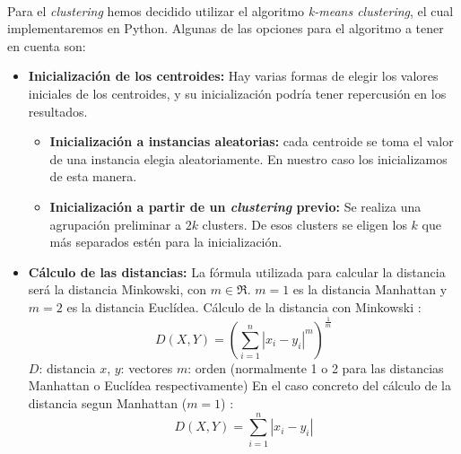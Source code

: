 \documentclass[10pt,a4paper]{article}
\begin{document}
	\paragraph{}
	Para el \textit{clustering} hemos decidido utilizar el algoritmo \textit{k-means clustering}, el cual implementaremos en Python. Algunas de las opciones para el algoritmo a tener en cuenta son:
	\begin{itemize}
		\item \textbf{Inicialización de los centroides:} Hay varias formas de elegir los valores iniciales de los centroides, y su inicialización podría tener repercusión en los resultados.
		\begin{itemize}
		    \item \textbf{Inicialización a instancias aleatorias: } cada centroide se toma el valor de una instancia elegia aleatoriamente. En nuestro caso los inicializamos de esta manera.
		    \item \textbf{Inicialización a partir de un \textit{clustering} previo:} Se realiza una agrupación preliminar a $2k$ clusters. De esos clusters se eligen los $k$ que más separados estén para la inicialización.
	    \end{itemize}
		\item \textbf{Cálculo de las distancias:} La fórmula utilizada para calcular la distancia será la distancia Minkowski, con \(m \in \Re\). \(m=1\) es la distancia Manhattan y \(m=2\) es la distancia Euclídea.
		Cálculo de la distancia con Minkowski \cite{Minkowski}: 
		    \begin{equation}
		    	 D(X,Y)=(\sum_{i=1}^n |x_i - y_i|^m)^\frac{1}{m}
			\end{equation}		    
		    $D$: distancia \newline
		    $x$, $y$: vectores  \newline
		    $m$: orden (normalmente 1 o 2 para las distancias Manhattan o Euclídea respectivamente)\newline
		En el caso concreto del cálculo de la distancia segun Manhattan (\(m=1\)) \cite{Minkowski}:
		\begin{equation}
		    D(X,Y)=\sum_{i=1}^n |x_i - y_i|
		\end{equation}
		

\end{itemize}
\end{document}
